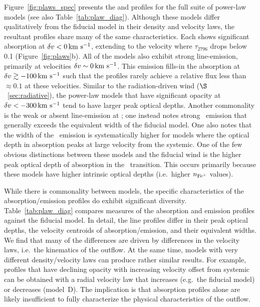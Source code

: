 \documentclass[12pt,preprint]{aastex}
\begin{document}
Figure~\ref{fig:plaws_spec} presents the  and 
profiles for the full suite of power-law models (see also
Table~\ref{tab:plaw_diag}).  Although these
models differ qualitatively from the fiducial model in their density
and velocity laws, the resultant profiles share many of the same
characteristics.  Each shows significant absorption at $\delta v < 0
\, {\rm km~s^{-1}}$, extending to the velocity where $\tau_{2796}$ drops below 0.1
(Figure~\ref{fig:plaws}b).  All of the models also exhibit strong
line-emission, primarily at velocities $\delta v \sim 0 \, {\rm km~s^{-1}}$.  
This emission fills-in the  absorption at $\delta v \gtrsim
-100 \, {\rm km~s^{-1}}$ such that the profiles rarely achieve a relative flux less
than $\approx 0.1$ at these velocities. 
Similar to the radiation-driven wind ($\S$~\ref{sec:radiative}),
the power-law models that have significant opacity at $\delta v <
-300 \, {\rm km~s^{-1}}$ tend to have larger peak optical depths.  Another commonality is
the weak or absent line-emission at \feiia; one instead notes strong
\feiic\ emission that generally exceeds the equivalent width of the
fiducial model.  One also notes that the width of the \feiis\ emission
is systematically higher for models where the optical depth in
absorption peaks at large velocity from the systemic.
One of the few obvious distinctions between these models and the fiducial wind is
the higher peak optical depth of absorption in the \feiib\
transition.  This occurs primarily because these models have 
higher intrinsic optical depths (i.e.\ higher $n_{\rm Fe^+}$ values).

While there is commonality between models, the specific
characteristics of the absorption/emission profiles do exhibit
significant diversity.
Table~\ref{tab:plaw_diag} compares measures of the absorption and
emission profiles against the fiducial model.
In detail, the line profiles differ in their peak optical depths,
the velocity centroids of absorption/emission, and their equivalent widths.
We find that many of the differences are driven by differences in
the velocity laws, i.e.\ the kinematics of the outflow.
At the same time, models with very different density/velocity laws can
produce rather similar results.  For example, profiles that have declining
opacity with increasing velocity offset from systemic can be obtained
with a radial velocity law that increases (e.g.\ the fiducial model)
or decreases (model~D).  The implication is that absorption profiles
alone are likely insufficient to fully characterize the physical
characteristics of the outflow.
\end{document}

